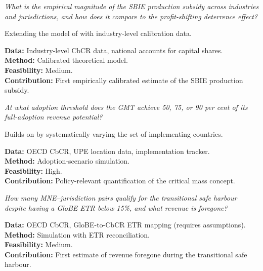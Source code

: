 \documentclass[12pt,a4paper]{article}
\begin{document}
\begin{description}[style=nextline,leftmargin=2cm]

\item[D1. SBIE production subsidy calibration.]
\emph{What is the empirical magnitude of the SBIE production subsidy across industries and jurisdictions, and how does it compare to the profit-shifting deterrence effect?}

Extending the model of \textcite{schjelderup2024} with industry-level calibration data.

\textbf{Data:} Industry-level CbCR data, national accounts for capital shares.\\
\textbf{Method:} Calibrated theoretical model.\\
\textbf{Feasibility:} Medium.\\
\textbf{Contribution:} First empirically calibrated estimate of the SBIE production subsidy.

\item[D2. Critical mass scenarios.]
\emph{At what adoption threshold does the GMT achieve 50, 75, or 90 per cent of its full-adoption revenue potential?}

Builds on \textcite{devereux2023} by systematically varying the set of implementing countries.

\textbf{Data:} OECD CbCR, UPE location data, implementation tracker.\\
\textbf{Method:} Adoption-scenario simulation.\\
\textbf{Feasibility:} High.\\
\textbf{Contribution:} Policy-relevant quantification of the critical mass concept.

\item[D3. Safe harbour leakage.]
\emph{How many MNE--jurisdiction pairs qualify for the transitional safe harbour despite having a GloBE ETR below 15\%, and what revenue is foregone?}

\textbf{Data:} OECD CbCR, GloBE-to-CbCR ETR mapping (requires assumptions).\\
\textbf{Method:} Simulation with ETR reconciliation.\\
\textbf{Feasibility:} Medium.\\
\textbf{Contribution:} First estimate of revenue foregone during the transitional safe harbour.

\end{description}


\end{document}
